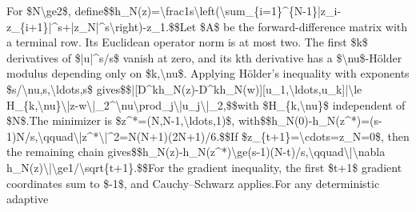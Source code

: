\documentclass[10pt,a4paper]{article}
\begin{document}
\begingroup\raggedright\sloppy For \$N\textbackslash{}ge2\$,\allowbreak{} define\newline{}\$\$h\_\allowbreak{}N(z)=\allowbreak{}\textbackslash{}frac1s\textbackslash{}left(\textbackslash{}sum\_\allowbreak{}\{i=\allowbreak{}1\}\textasciicircum{}\{N-1\}|z\_\allowbreak{}i-z\_\allowbreak{}\{i+1\}|\textasciicircum{}s+|z\_\allowbreak{}N|\textasciicircum{}s\textbackslash{}right)-z\_\allowbreak{}1.\$\$\newline{}Let \$A\$ be the forward-difference matrix with a terminal row. Its Euclidean operator norm is at most two. The first \$k\$ derivatives of \$|u|\textasciicircum{}s/\allowbreak{}s\$ vanish at zero,\allowbreak{} and its kth derivative has a \$\textbackslash{}nu\$-H{\AtlasUnicodeText ö}\allowbreak{}lder modulus depending only on \$k,\allowbreak{}\textbackslash{}nu\$. Applying H{\AtlasUnicodeText ö}\allowbreak{}lder's inequality with exponents \$s/\allowbreak{}\textbackslash{}nu,\allowbreak{}s,\allowbreak{}\textbackslash{}ldots,\allowbreak{}s\$ gives\newline{}\$\$|[D\textasciicircum{}kh\_\allowbreak{}N(z)-D\textasciicircum{}kh\_\allowbreak{}N(w)][u\_\allowbreak{}1,\allowbreak{}\textbackslash{}ldots,\allowbreak{}u\_\allowbreak{}k]|\newline{}\textbackslash{}le H\_\allowbreak{}\{k,\allowbreak{}\textbackslash{}nu\}\textbackslash{}|z-w\textbackslash{}|\_\allowbreak{}2\textasciicircum{}\textbackslash{}nu\textbackslash{}prod\_\allowbreak{}j\textbackslash{}|u\_\allowbreak{}j\textbackslash{}|\_\allowbreak{}2,\allowbreak{}\$\$\newline{}with \$H\_\allowbreak{}\{k,\allowbreak{}\textbackslash{}nu\}\$ independent of \$N\$.\newline{}\newline{}The minimizer is \$z\textasciicircum{}*=\allowbreak{}(N,\allowbreak{}N-1,\allowbreak{}\textbackslash{}ldots,\allowbreak{}1)\$,\allowbreak{} with\newline{}\$\$h\_\allowbreak{}N(0)-h\_\allowbreak{}N(z\textasciicircum{}*)=\allowbreak{}(s-1)N/\allowbreak{}s,\allowbreak{}\textbackslash{}qquad\newline{}\textbackslash{}|z\textasciicircum{}*\textbackslash{}|\textasciicircum{}2=\allowbreak{}N(N+1)(2N+1)/\allowbreak{}6.\$\$\newline{}If \$z\_\allowbreak{}\{t+1\}=\allowbreak{}\textbackslash{}cdots=\allowbreak{}z\_\allowbreak{}N=\allowbreak{}0\$,\allowbreak{} then the remaining chain gives\newline{}\$\$h\_\allowbreak{}N(z)-h\_\allowbreak{}N(z\textasciicircum{}*)\textbackslash{}ge(s-1)(N-t)/\allowbreak{}s,\allowbreak{}\textbackslash{}qquad\newline{}\textbackslash{}|\textbackslash{}nabla h\_\allowbreak{}N(z)\textbackslash{}|\textbackslash{}ge1/\allowbreak{}\textbackslash{}sqrt\{t+1\}.\$\$\newline{}For the gradient inequality,\allowbreak{} the first \$t+1\$ gradient coordinates sum to \$-1\$,\allowbreak{} and Cauchy{\AtlasUnicodeText –}\allowbreak{}Schwarz applies.\newline{}\newline{}For any deterministic adaptive 
\end{document}
